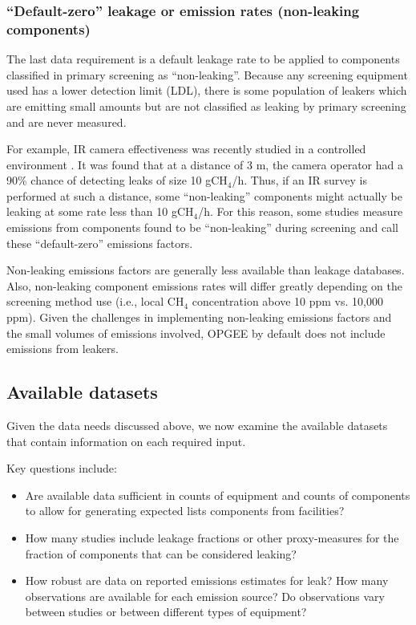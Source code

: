 \documentclass[11pt]{report}
\begin{document}
{{{{\subsubsection{``Default-zero'' leakage or emission rates (non-leaking components)}

The last data requirement is a default leakage rate to be applied to components classified in primary screening as ``non-leaking''. Because any screening equipment used has a lower detection limit (LDL), there is some population of leakers which are emitting small amounts but are not classified as leaking by primary screening and are never measured. 

For example, IR camera effectiveness was recently studied in a controlled environment \cite{Ravikumar2018}. It was found that at a distance of 3 m, the camera operator had a 90\% chance of detecting leaks of size 10 gCH$_4$/h. Thus, if an IR survey is performed at such a distance, some ``non-leaking'' components might actually be leaking at some rate less than 10 gCH$_4$/h. For this reason, some studies measure emissions from components found to be ``non-leaking'' during screening and call these ``default-zero'' emissions factors.

Non-leaking emissions factors are generally less available than leakage databases. Also, non-leaking component emissions rates will differ greatly depending on the screening method use (i.e., local CH$_4$ concentration above 10 ppm vs. 10,000 ppm). Given the challenges in implementing non-leaking emissions factors and the small volumes of emissions involved, OPGEE by default does not include emissions from leakers.


\subsection{Available datasets}


Given the data needs discussed above, we now examine the available datasets that contain information on each required input.

Key questions include: 
\begin{itemize}
\item Are available data sufficient in counts of equipment and counts of components to allow for generating expected lists components from facilities? 
\item How many studies include leakage fractions or other proxy-measures for the fraction of components that can be considered leaking?
\item How robust are data on reported emissions estimates for leak? How many observations are available for each emission source? Do observations vary between studies or between different types of equipment?
\end{itemize}

}}}}
\end{document}
